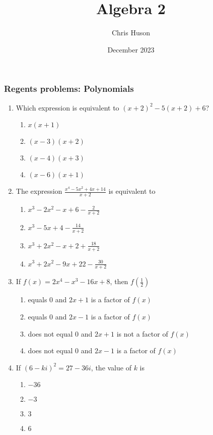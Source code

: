 \documentclass[12pt, twoside]{article}
\title{Algebra 2}
\author{Chris Huson}
\date{December 2023}
\begin{document}
\subsubsection*{Regents problems: Polynomials}
\begin{enumerate}[itemsep=0.5cm]
\item Which expression is equivalent to $(x + 2)^2 - 5(x + 2) + 6$?
\begin{enumerate}
    \item $x(x + 1)$
    \item $(x - 3)(x + 2)$
    \item $(x - 4)(x + 3)$
    \item $(x - 6)(x + 1)$
\end{enumerate}

\item The expression $\displaystyle \frac{x^4 - 5x^2 + 4x + 14}{x+2}$ is equivalent to
\begin{enumerate}
    \item $\displaystyle x^3 - 2x^2 - x + 6 - \frac{2}{x + 2}$
    \item $\displaystyle x^3 - 5x + 4 - \frac{14}{x + 2}$
    \item $\displaystyle x^3 + 2x^2 - x + 2 + \frac{18}{x + 2}$
    \item $\displaystyle x^3 + 2x^2 - 9x + 22 - \frac{30}{x + 2}$
\end{enumerate}

\item If \(f(x) = 2x^4 - x^3 - 16x + 8\), then \(f\left(\frac{1}{2}\right)\)
\begin{enumerate}
    \item equals 0 and \(2x + 1\) is a factor of \(f(x)\)
    \item equals 0 and \(2x - 1\) is a factor of \(f(x)\)
    \item does not equal 0 and \(2x + 1\) is not a factor of \(f(x)\)
    \item does not equal 0 and \(2x - 1\) is a factor of \(f(x)\)
\end{enumerate}

\item If \((6 - ki)^2 = 27 - 36i\), the value of \(k\) is
\begin{enumerate}
    \item \(-36\)
    \item \(-3\)
    \item \(3\)
    \item \(6\)
\end{enumerate}


\end{enumerate}
\end{document}

